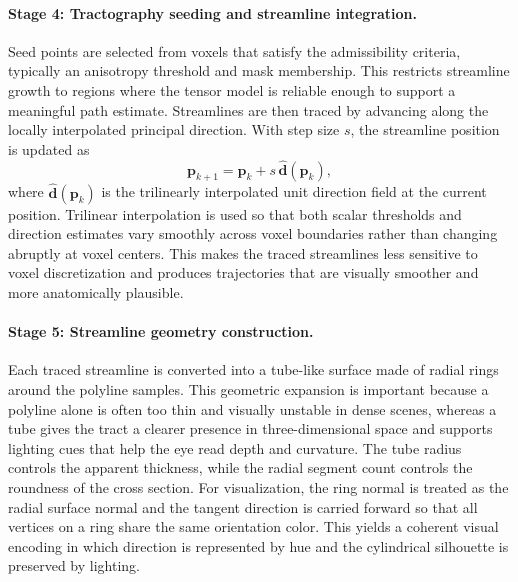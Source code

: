 \paragraph{Stage 4: Tractography seeding and streamline integration.}
Seed points are selected from voxels that satisfy the admissibility criteria, typically an anisotropy threshold and mask membership. This restricts streamline growth to regions where the tensor model is reliable enough to support a meaningful path estimate. Streamlines are then traced by advancing along the locally interpolated principal direction. With step size $s$, the streamline position is updated as
\begin{equation}
\mathbf{p}_{k+1} = \mathbf{p}_k + s\, \hat{\mathbf{d}}(\mathbf{p}_k),
\end{equation}
where $\hat{\mathbf{d}}(\mathbf{p}_k)$ is the trilinearly interpolated unit direction field at the current position. Trilinear interpolation is used so that both scalar thresholds and direction estimates vary smoothly across voxel boundaries rather than changing abruptly at voxel centers. This makes the traced streamlines less sensitive to voxel discretization and produces trajectories that are visually smoother and more anatomically plausible.

\paragraph{Stage 5: Streamline geometry construction.}
Each traced streamline is converted into a tube-like surface made of radial rings around the polyline samples. This geometric expansion is important because a polyline alone is often too thin and visually unstable in dense scenes, whereas a tube gives the tract a clearer presence in three-dimensional space and supports lighting cues that help the eye read depth and curvature. The tube radius controls the apparent thickness, while the radial segment count controls the roundness of the cross section. For visualization, the ring normal is treated as the radial surface normal and the tangent direction is carried forward so that all vertices on a ring share the same orientation color. This yields a coherent visual encoding in which direction is represented by hue and the cylindrical silhouette is preserved by lighting.

